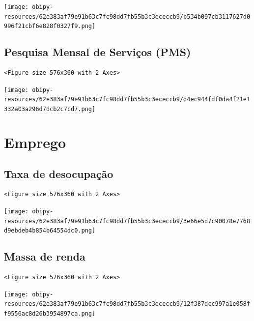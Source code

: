 \documentclass[11pt]{article}
\begin{document}
\begin{center}
\texttt{[image: obipy-resources/62e383af79e91b63c7fc98dd7fb55b3c3ececcb9/b534b097cb3117627d0996f21cbf6e828f0327f9.png]}
\end{center}


\subsection{Pesquisa Mensal de Serviços (PMS)}
\label{sec:org2e2eff4}

\begin{verbatim}
<Figure size 576x360 with 2 Axes>
\end{verbatim}


\begin{center}
\texttt{[image: obipy-resources/62e383af79e91b63c7fc98dd7fb55b3c3ececcb9/d4ec944fdf0da4f21e1332a03a296d7dcb2c7cd7.png]}
\end{center}

\section{Emprego}
\label{sec:orgb66f8d6}



\subsection{Taxa de desocupação}
\label{sec:org9f31817}

\begin{verbatim}
<Figure size 576x360 with 2 Axes>
\end{verbatim}


\begin{center}
\texttt{[image: obipy-resources/62e383af79e91b63c7fc98dd7fb55b3c3ececcb9/3e66e5d7c90078e7768d9ebdeb4b854b64554dc0.png]}
\end{center}


\subsection{Massa de renda}
\label{sec:org3fc221a}

\begin{verbatim}
<Figure size 576x360 with 2 Axes>
\end{verbatim}


\begin{center}
\texttt{[image: obipy-resources/62e383af79e91b63c7fc98dd7fb55b3c3ececcb9/12f387dcc997a1e058ff9556ac8d26b3954897ca.png]}
\end{center}
\end{document}
